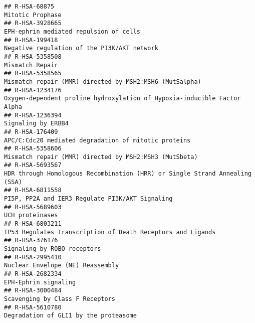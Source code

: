 \documentclass[
]{article}
\begin{document}
\begin{verbatim}
## R-HSA-68875                                                                                                                       Mitotic Prophase
## R-HSA-3928665                                                                                               EPH-ephrin mediated repulsion of cells
## R-HSA-199418                                                                                           Negative regulation of the PI3K/AKT network
## R-HSA-5358508                                                                                                                      Mismatch Repair
## R-HSA-5358565                                                                              Mismatch repair (MMR) directed by MSH2:MSH6 (MutSalpha)
## R-HSA-1234176                                                             Oxygen-dependent proline hydroxylation of Hypoxia-inducible Factor Alpha
## R-HSA-1236394                                                                                                                   Signaling by ERBB4
## R-HSA-176409                                                                                  APC/C:Cdc20 mediated degradation of mitotic proteins
## R-HSA-5358606                                                                               Mismatch repair (MMR) directed by MSH2:MSH3 (MutSbeta)
## R-HSA-5693567                                                          HDR through Homologous Recombination (HRR) or Single Strand Annealing (SSA)
## R-HSA-6811558                                                                                      PI5P, PP2A and IER3 Regulate PI3K/AKT Signaling
## R-HSA-5689603                                                                                                                      UCH proteinases
## R-HSA-6803211                                                                          TP53 Regulates Transcription of Death Receptors and Ligands
## R-HSA-376176                                                                                                           Signaling by ROBO receptors
## R-HSA-2995410                                                                                                     Nuclear Envelope (NE) Reassembly
## R-HSA-2682334                                                                                                                 EPH-Ephrin signaling
## R-HSA-3000484                                                                                                      Scavenging by Class F Receptors
## R-HSA-5610780                                                                                                Degradation of GLI1 by the proteasome

\end{verbatim}
\end{document}
